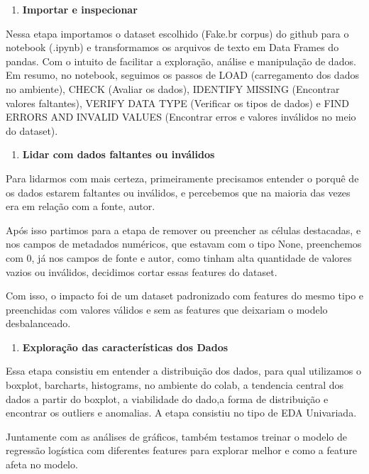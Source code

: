 \documentclass[
  brazilian,
  11pt,
]{article}
\providecommand{\tightlist}{%
  \setlength{\itemsep}{0pt}\setlength{\parskip}{0pt}}
\begin{document}
\begin{enumerate}
\def\labelenumi{\arabic{enumi}.}
\tightlist
\item
  \textbf{Importar e inspecionar}
\end{enumerate}

Nessa etapa importamos o dataset escolhido (Fake.br corpus) do github para o notebook (.ipynb) e transformamos os arquivos de texto em Data Frames do pandas. Com o intuito de facilitar a exploração, análise e manipulação de dados. Em resumo, no notebook, seguimos os passos de LOAD (carregamento dos dados no ambiente), CHECK (Avaliar os dados), IDENTIFY MISSING (Encontrar valores faltantes), VERIFY DATA TYPE (Verificar os tipos de dados) e FIND ERRORS AND INVALID VALUES (Encontrar erros e valores inválidos no meio do dataset).

\begin{enumerate}
\def\labelenumi{\arabic{enumi}.}
\tightlist
\item
  \textbf{Lidar com dados faltantes ou inválidos}
\end{enumerate}

Para lidarmos com mais certeza, primeiramente precisamos entender o porquê de os dados estarem faltantes ou inválidos, e percebemos que na maioria das vezes era em relação com a fonte, autor.

Após isso partimos para a etapa de remover ou preencher as células destacadas, e nos campos de metadados numéricos, que estavam com o tipo None, preenchemos com 0, já nos campos de fonte e autor, como tinham alta quantidade de valores vazios ou inválidos, decidimos cortar essas features do dataset.

Com isso, o impacto foi de um dataset padronizado com features do mesmo tipo e preenchidas com valores válidos e sem as features que deixariam o modelo desbalanceado.

\begin{enumerate}
\def\labelenumi{\arabic{enumi}.}
\tightlist
\item
  \textbf{Exploração das características dos Dados}
\end{enumerate}

Essa etapa consistiu em entender a distribuição dos dados, para qual utilizamos o boxplot, barcharts, histograms, no ambiente do colab, a tendencia central dos dados a partir do boxplot, a viabilidade do dado,a forma de distribuição e encontrar os outliers e anomalias. A etapa consistiu no tipo de EDA Univariada.

Juntamente com as análises de gráficos, também testamos treinar o modelo de regressão logística com diferentes features para explorar melhor e como a feature afeta no modelo.
\end{document}
